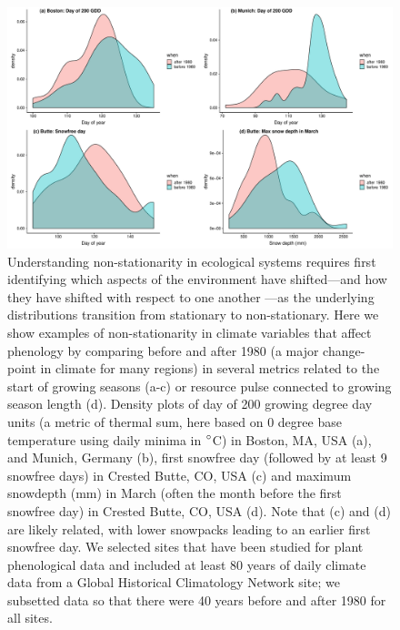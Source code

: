 \documentclass[11pt,letterpaper]{article}
\begin{document}
\begin{figure}[h!]
\centering
\includegraphics[width=1\textwidth]{..//..//..//..//R/graphs/otherdat/climdata.pdf}
\caption{Understanding non-stationarity in ecological systems requires first identifying which aspects of the environment have shifted---and how they have shifted with respect to one another \citep[e.g.,][]{cookwine2016,wadgymar2018}---as the underlying  distributions transition from stationary to non-stationary. Here we show examples of non-stationarity in climate variables that affect phenology by comparing before and after 1980 (a major change-point in climate for many regions) in several metrics related to the start of growing seasons (a-c) or resource pulse connected to growing season length (d). Density plots of day of 200 growing degree day units (a metric of thermal sum, here based on 0 degree base temperature using daily minima in $\degree$C) in Boston, MA, USA (a), and Munich, Germany (b), first snowfree day (followed by at least 9 snowfree days) in Crested Butte, CO, USA (c) and maximum snowdepth (mm) in March (often the month before the first snowfree day) in Crested Butte, CO, USA (d). Note that (c) and (d) are likely related, with lower snowpacks leading to an earlier first snowfree day. We selected sites that have been studied for plant phenological data and included at least 80 years of daily climate data from a Global Historical Climatology Network site; we subsetted data so that there were 40 years before and after 1980 for all sites.} %
 \label{fig:climdat}
\end{figure}
\end{document}
